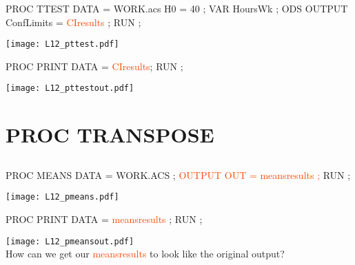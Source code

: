 \begin{frame}[fragile]
\hspace*{-0.3in}
\footnotesize
\begin{code}{.0}
PROC TTEST DATA = WORK.acs H0 = 40 ;
  VAR HoursWk ;
  ODS OUTPUT ConfLimits = \textcolor{OrangeRed}{CIresults} ;
RUN ;
\end{code}
\vspace{2ex}
\begin{center}
\texttt{[image: L12\_pttest.pdf]}
\end{center}
\emp
{} \hspace{0.5in} \emp
{}
\footnotesize
\begin{code}{.0}
PROC PRINT DATA = \textcolor{OrangeRed}{CIresults};
RUN ;


\end{code}
\vspace{2ex}
\texttt{[image: L12\_pttestout.pdf]}
\vspace{5ex}
\emp
\end{frame}

\section[PROC TRANSPOSE]{PROC TRANSPOSE}
\subsection{}
\begin{frame}
\end{frame}

\begin{frame}[fragile]
\hspace*{-0.3in}
\footnotesize
\begin{code}{.0}
PROC MEANS DATA = WORK.ACS ;
   \textcolor{OrangeRed}{OUTPUT OUT = meansresults ;}
RUN ;
\end{code}
\vspace{4ex}
\texttt{[image: L12\_pmeans.pdf]}
\emp
{} \hspace{0.5in} \emp
{}
\footnotesize
\begin{code}{.0}
PROC PRINT DATA = \textcolor{OrangeRed}{meansresults} ;
RUN ;

\end{code}
\vspace{2ex}
\texttt{[image: L12\_pmeansout.pdf]}
\emp\\
\oyo How can we get our \textcolor{OrangeRed}{meansresults} to look like the original output?
\end{frame}



